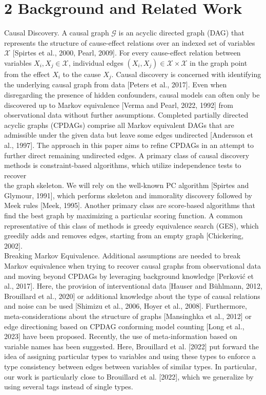 \documentclass[10pt]{article}
\begin{document}
\section*{2 Background and Related Work}
Causal Discovery. A causal graph $\mathcal{G}$ is an acyclic directed graph (DAG) that represents the structure of cause-effect relations over an indexed set of variables $\mathcal{X}$ [Spirtes et al., 2000, Pearl, 2009]. For every cause-effect relation between variables $X_{i}, X_{j} \in \mathcal{X}$, individual edges $\left(X_{i}, X_{j}\right) \in \mathcal{X} \times \mathcal{X}$ in the graph point from the effect $X_{i}$ to the cause $X_{j}$. Causal discovery is concerned with identifying the underlying causal graph from data [Peters et al., 2017]. Even when disregarding the presence of hidden confounders, causal models can often only be discovered up to Markov equivalence [Verma and Pearl, 2022, 1992] from observational data without further assumptions. Completed partially directed acyclic graphs (CPDAGs) comprise all Markov equivalent DAGs that are admissible under the given data but leave some edges undirected [Andersson et al., 1997]. The approach in this paper aims to refine CPDAGs in an attempt to further direct remaining undirected edges. A primary class of causal discovery methods is constraint-based algorithms, which utilize independence tests to recover\\[0pt]
the graph skeleton. We will rely on the well-known PC algorithm [Spirtes and Glymour, 1991], which performs skeleton and immorality discovery followed by Meek rules [Meek, 1995]. Another primary class are score-based algorithms that find the best graph by maximizing a particular scoring function. A common representative of this class of methods is greedy equivalence search (GES), which greedily adds and removes edges, starting from an empty graph [Chickering, 2002].\\[0pt]
Breaking Markov Equivalence. Additional assumptions are needed to break Markov equivalence when trying to recover causal graphs from observational data and moving beyond CPDAGs by leveraging background knowledge [Perković et al., 2017]. Here, the provision of interventional data [Hauser and Bühlmann, 2012, Brouillard et al., 2020] or additional knowledge about the type of causal relations and noise can be used [Shimizu et al., 2006, Hoyer et al., 2008]. Furthermore, meta-considerations about the structure of graphs [Mansinghka et al., 2012] or edge directioning based on CPDAG conforming model counting [Long et al., 2023] have been proposed. Recently, the use of meta-information based on variable names has been suggested. Here, Brouillard et al. [2022] put forward the idea of assigning particular types to variables and using these types to enforce a type consistency between edges between variables of similar types. In particular, our work is particularly close to Brouillard et al. [2022], which we generalize by using several tags instead of single types.
\end{document}
